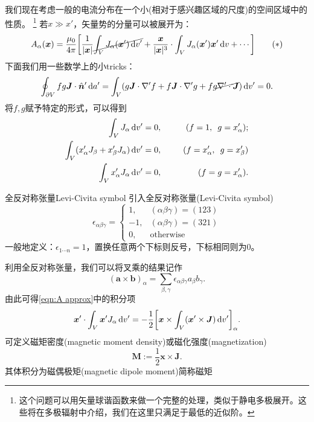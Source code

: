 我们现在考虑一般的电流分布在一个小(相对于感兴趣区域的尺度)的空间区域中的性质。
\footnote{这个问题可以用矢量球谐函数来做一个完整的处理，类似于静电多极展开。这些将在多极辐射中介绍，我们在这里只满足于最低的近似阶。}
若$x\gg x'$，矢量势的分量可以被展开为：
\begin{equation}
    \label{eqn:A approx}
    A_\alpha(\bm x)=\frac{\mu_0}{4\pi}\biggl[\frac1{|\bm x|}\cancel{\int_V J_\alpha(\bm x')\mathop{}\!\mathrm{d} v'}+\frac{\bm x}{|\bm x|^3}\cdot\int_V J_\alpha(\bm x')\bm x'\mathop{}\!\mathrm{d} v+\cdots\biggr]
    \tag{$\ast$}
\end{equation}
下面我们用一些数学上的小tricks：
\[
    \oint_{\partial V}fg\bm J\cdot\mathop{}\!\hat{\bm{n}}'\mathop{}\!\mathrm{d} a'=\int_V(g\bm J\cdot\nabla'f+f\bm J\cdot\nabla'g+fg\cancel{\nabla'\cdot\bm J})\mathop{}\!\mathrm{d} v'=0.
\]
将$f,g$赋予特定的形式，可以得到
\begin{alignat*}{2}
    \int_V J_\alpha \mathop{}\!\mathrm{d} v'&=0,&\qquad (f=1,\enspace g=x_\alpha');\\
    \int_V(x_\alpha'J_\beta+x_\beta'J_\alpha)\mathop{}\!\mathrm{d} v'&=0,&(f=x_\alpha',\enspace g=x_\beta')\\
    \int_V x_\alpha'J_\alpha\mathop{}\!\mathrm{d} v'&=0,&(f=g=x_\alpha').
\end{alignat*}
\begin{definition}{全反对称张量}{Levi-Civita symbol}
    引入全反对称张量(Levi-Civita symbol)
    \begin{equation}
        \epsilon_{\alpha\beta\gamma}=\begin{cases}
            1,&(\alpha\beta\gamma)=(123)\\
            -1,&(\alpha\beta\gamma)=(321)\\
            0,&\text{otherwise}
        \end{cases}
    \end{equation}
    一般地定义：$\epsilon_{1\cdots n}=1$，置换任意两个下标则反号，下标相同则为0。
\end{definition}
利用全反对称张量，我们可以将叉乘的结果记作
\begin{equation}
    (\bm a\times\bm b)_\alpha=\sum_{\beta,\gamma}\epsilon_{\alpha\beta\gamma}a_\beta b_\gamma.
\end{equation}
由此可得\eqref{eqn:A approx}中的积分项
\[
    \bm x'\cdot\int_V\bm x'J_\alpha\mathop{}\!\mathrm{d} v'=-\frac12\biggl[\bm x\times\int_V(\bm x'\times\bm J)\mathop{}\!\mathrm{d} v'\biggr]_\alpha.
\]
可定义磁矩密度(magnetic moment density)或磁化强度(magnetization)
\begin{equation}
    \bm M:=\frac12\bm x\times\bm J.
\end{equation}
其体积分为磁偶极矩(magnetic dipole moment)简称磁矩

